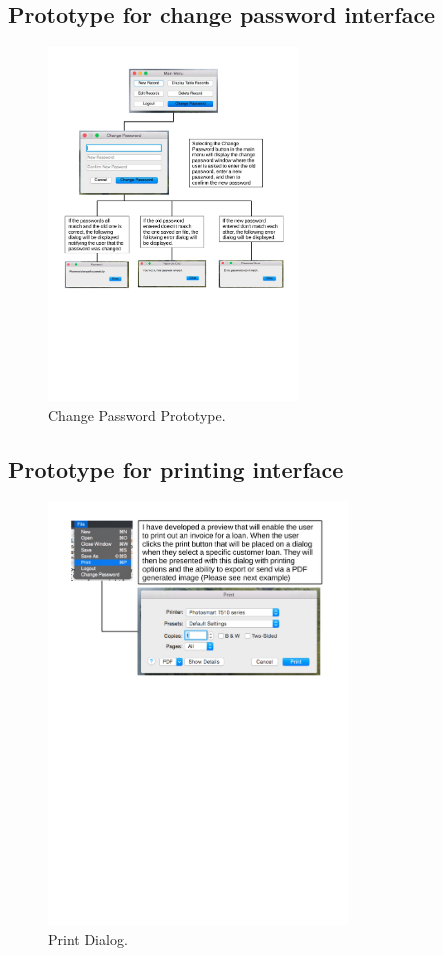 \subsection{\textbf{Prototype for change password interface}}
\begin{figure}[H]
    \centerline{\includegraphics[width=250px]{./Design/Prototyping/Change_password_prototyping.pdf}}
    \caption{Change Password Prototype.} \label{fig:relationship_diagram}
\end{figure}

\subsection{\textbf{Prototype for printing interface}}
\begin{figure}[H]
    \centerline{\includegraphics[width=300px]{./Design/Prototyping/Printing_prototyping.pdf}}
    \caption{Print Dialog.} \label{fig:relationship_diagram}
\end{figure}


